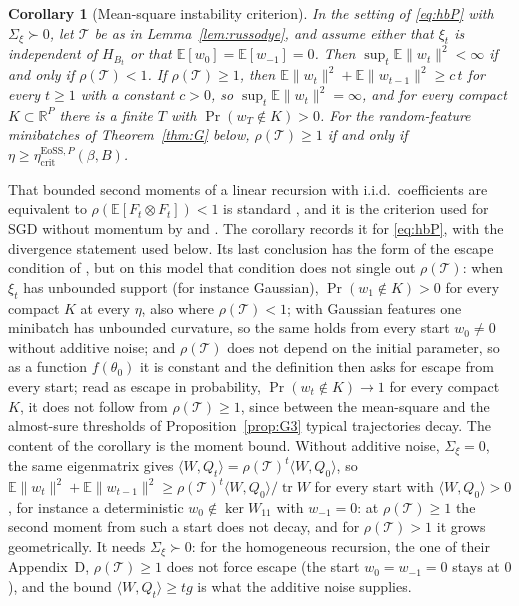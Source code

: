 \documentclass[11pt]{article}
\newtheorem{corollary}[theorem]{Corollary}
\theoremstyle{remark}
\newcommand{\etacrit}{\eta_{\mathrm{crit}}}
\newcommand{\E}{\mathbb{E}}
\newcommand{\R}{\mathbb{R}}
\newcommand{\tr}{\operatorname{tr}}
\begin{document}
\begin{corollary}[Mean-square instability criterion]\label{cor:msinstab}
In the setting of \eqref{eq:hbP} with $\Sigma_\xi\succ0$, let $\mathcal T$ be as in Lemma~\ref{lem:russodye}, and assume either that $\xi_t$ is independent of $H_{B_t}$ or that $\E[w_0]=\E[w_{-1}]=0$. Then $\sup_t\E\|w_t\|^2<\infty$ if and only if $\rho(\mathcal T)<1$. If $\rho(\mathcal T)\ge1$, then $\E\|w_t\|^2+\E\|w_{t-1}\|^2\ge c\,t$ for every $t\ge1$ with a constant $c>0$, so $\sup_t\E\|w_t\|^2=\infty$, and for every compact $K\subset\R^P$ there is a finite $T$ with $\Pr(w_T\notin K)>0$. For the random-feature minibatches of Theorem~\ref{thm:G} below, $\rho(\mathcal T)\ge1$ if and only if $\eta\ge\etacrit^{\mathrm{EoSS},P}(\beta,B)$.
\end{corollary}
That bounded second moments of a linear recursion with i.i.d.\ coefficients are equivalent to $\rho(\E[F_t\otimes F_t])<1$ is standard \citep[Chapter~3]{costa2005mjls}, and it is the criterion used for SGD without momentum by \citet{ma2021linear} and \citet{mulayoff2024exact}. The corollary records it for \eqref{eq:hbP}, with the divergence statement used below. Its last conclusion has the form of the escape condition of \citet[Definition~A.1]{andreyev2026momentum}, but on this model that condition does not single out $\rho(\mathcal T)$: when $\xi_t$ has unbounded support (for instance Gaussian), $\Pr(w_1\notin K)>0$ for every compact $K$ at every $\eta$, also where $\rho(\mathcal T)<1$; with Gaussian features one minibatch has unbounded curvature, so the same holds from every start $w_0\ne0$ without additive noise; and $\rho(\mathcal T)$ does not depend on the initial parameter, so as a function $f(\theta_0)$ it is constant and the definition then asks for escape from every start; read as escape in probability, $\Pr(w_t\notin K)\to1$ for every compact $K$, it does not follow from $\rho(\mathcal T)\ge1$, since between the mean-square and the almost-sure thresholds of Proposition~\ref{prop:G3} typical trajectories decay. The content of the corollary is the moment bound. Without additive noise, $\Sigma_\xi=0$, the same eigenmatrix gives $\langle W,Q_t\rangle=\rho(\mathcal T)^t\langle W,Q_0\rangle$, so $\E\|w_t\|^2+\E\|w_{t-1}\|^2\ge\rho(\mathcal T)^t\langle W,Q_0\rangle/\tr W$ for every start with $\langle W,Q_0\rangle>0$, for instance a deterministic $w_0\notin\ker W_{11}$ with $w_{-1}=0$: at $\rho(\mathcal T)\ge1$ the second moment from such a start does not decay, and for $\rho(\mathcal T)>1$ it grows geometrically. It needs $\Sigma_\xi\succ0$: for the homogeneous recursion, the one of their Appendix~D, $\rho(\mathcal T)\ge1$ does not force escape (the start $w_0=w_{-1}=0$ stays at $0$), and the bound $\langle W,Q_t\rangle\ge tg$ is what the additive noise supplies.
\end{document}
